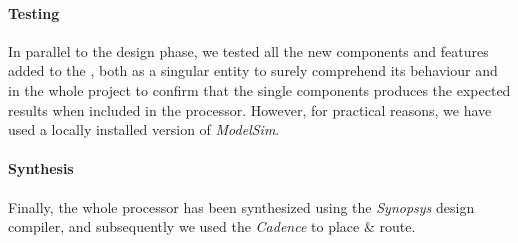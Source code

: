 \paragraph{Testing}
In parallel to the design phase, we tested all the new components and features added to the \dlx, both as a singular entity to surely comprehend its behaviour and in the whole project to confirm that the single components produces the expected results when included in the processor. However, for practical reasons, we have used a locally installed version of \textit{ModelSim}.


\paragraph{Synthesis}
Finally, the whole processor has been synthesized using the \textit{Synopsys} design compiler, and subsequently we used the  \textit{Cadence} to place \& route.